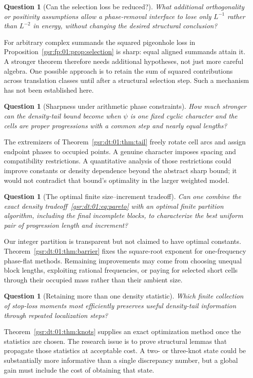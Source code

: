 \documentclass[11pt,letterpaper]{article}
\numberwithin{equation}{section}
\newtheorem{question}[theorem]{Question}
\theoremstyle{definition}
\theoremstyle{remark}
\newcommand{\1}{\mathbf 1}
\begin{document}
\begin{question}[Can the selection loss be reduced?]
What additional orthogonality or positivity assumptions allow a
phase-removal interface to lose only $L^{-1}$ rather than $L^{-2}$ in
energy, without changing the desired structural conclusion?
\end{question}
For arbitrary complex summands the squared pigeonhole loss in
Proposition~\ref{gsr:fp:01:prop:selection} is sharp: equal aligned summands attain
it. A stronger theorem therefore needs additional hypotheses, not just
more careful algebra. One possible approach is to retain the sum of
squared contributions across translation classes until after a structural
selection step. Such a mechanism has not been established here.

\begin{question}[Sharpness under arithmetic phase constraints]
How much stronger can the density-tail bound become when $\psi$ is one
fixed cyclic character and the cells are proper progressions with a common
step and nearly equal lengths?
\end{question}
The extremizers of Theorem~\ref{gsr:dt:01:thm:tail} freely rotate cell arcs and assign
endpoint phases to occupied points. A genuine character imposes spacing
and compatibility restrictions. A quantitative analysis of those
restrictions could improve constants or density dependence beyond the
abstract sharp bound; it would not contradict that bound's optimality in
the larger weighted model.

\begin{question}[The optimal finite size--increment tradeoff]
Can one combine the exact density tradeoff~\eqref{gsr:dt:01:eq:pareto} with an
optimal finite partition algorithm, including the final incomplete blocks,
to characterize the best uniform pair of progression length and increment?
\end{question}
Our integer partition is transparent but not claimed to have optimal
constants. Theorem~\ref{gsr:dt:01:thm:barrier} fixes the square-root exponent for
one-frequency phase-flat methods. Remaining improvements may come from
choosing unequal block lengths, exploiting rational frequencies, or paying
for selected short cells through their occupied mass rather than their
ambient size.

\begin{question}[Retaining more than one density statistic]
Which finite collection of stop-loss moments most efficiently preserves
useful density-tail information through repeated localization steps?
\end{question}
Theorem~\ref{gsr:dt:01:thm:knots} supplies an exact optimization method once the
statistics are chosen. The research issue is to prove structural lemmas
that propagate those statistics at acceptable cost. A two- or three-knot
state could be substantially more informative than a single discrepancy
number, but a global gain must include the cost of obtaining that state.
\end{document}
